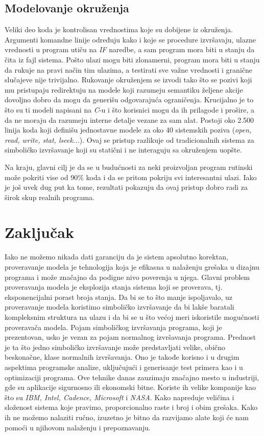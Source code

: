 \documentclass[a4paper]{article}
\begin{document}
\subsection{Modelovanje okruženja}
\label{subsec:podnaslov3}
Veliki deo koda je kontrolisan vrednostima koje su dobijene iz okruženja. Argumenti komandne linije određuju kako i koje se procedure izvršavaju, ulazne vrednosti u program utiču na 
\textit{IF} naredbe, a sam program mora biti u stanju da čita iz fajl sistema. Pošto ulazi mogu biti zlonamerni, program mora biti u stanju da rukuje na pravi način tim ulazima, a testirati sve važne vrednosti i granične slučajeve nije trivijalno.
Rukovanje okruženjem se izvodi tako što se pozivi koji mu pristupaju redirektuju na modele koji razumeju semantiku željene akcije  dovoljno dobro da mogu da generišu odgovarajuća ograničenja. Krucijalno je to što su ti modeli napisani na \textit{C}-u i što korisnici mogu da ih prilagode i prošire, a da ne moraju da razumeju interne detalje vezane za sam alat. Postoji oko 2.500 linija koda koji definišu jednostavne modele za oko 40 sistemskih poziva (\textit{open, read, write, stat, lseek...}). Ovaj se pristup razlikuje od tradicionalnih 
sistema za simboličko izvršavanje koji su statični i ne interaguju sa okruženjem uopšte. 

Na kraju, glavni cilj je da se u budućnosti za neki proizvoljan program rutinski može pokriti vise od 90\% koda i da se pritom pokriju svi interesantni ulazi. Iako je još uvek dug put ka tome, rezultati pokazuju da ovaj pristup dobro radi za širok skup realnih programa. 

\section{Zaključak}
\label{sec:zakljucak}
Iako ne možemo nikada dati garanciju da je sistem apsolutno korektan, proveravanje modela je tehnologija koja je efikasna u nalaženju grešaka u dizajnu programa i može značajno da podigne nivo poverenja u njega. Glavni problem proveravanja modela je eksplozija stanja sistema koji se proverava, tj. eksponencijalni porast broja stanja. Da bi se to što manje ispoljavalo, uz proveravanje modela koristimo simboličko izvršavanje da bi lakše baratali kompleksnim struktura na ulazu i da bi se u što većoj meri iskoristile mogućnosti proveravača modela. Pojam simboličkog izvršavanja programa, koji je prezentovan, usko je vezan za pojam normalnog izvršavanja programa. Prednost je ta što jedno simboličko izvršavanje može predstavljati velike, obično beskonačne, klase normalnih izvršavanja.
Ono je takođe korisno i u drugim aspektima programske analize, uključujući i generisanje test primera kao i u optimizaciji programa. Ove tehnike danas zauzimaju značajno mesto u industriji, gde su aplikacije sigurnosno ili ekonomski bitne. Koriste ih velike kompanije kao što su \textit{IBM, Intel, Cadence, 
Microsoft} i \textit{NASA}. Kako napreduje veličina i složenost sistema koje pravimo, proporcionalno raste i broj i obim grešaka. Kako ih ne možemo nalaziti ručno, izuzetno je bitno da razvijamo alate koji će nam pomoći u njihovom nalaženju i prepoznavanju. 



\appendix
 

\end{document}
